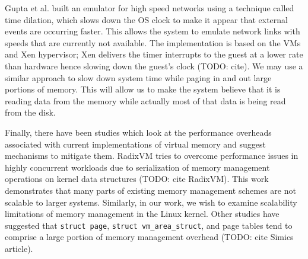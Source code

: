 \documentclass[twocolumn,11pt]{article}
\begin{document}
Gupta et al. built an emulator for high speed networks using a technique called
time dilation, which slows down the OS clock to make it appear that external
events are occurring faster. This allows the system to emulate network links
with speeds that are currently not available. The implementation is based on
the VMs and Xen hypervisor; Xen delivers the timer interrupts to the guest at a
lower rate than hardware hence  slowing down the guest’s clock (TODO: cite). We
may use a similar approach to slow down system time  while paging in and out
large portions of memory. This will allow us to make the system believe that it
is reading data from the memory while actually most of that data is being read
from the disk.

Finally, there have been studies which look at the performance overheads
associated with current implementations of virtual memory and suggest
mechanisms to mitigate them. RadixVM tries to overcome performance issues in
highly concurrent workloads due to serialization of memory management
operations on kernel data structures (TODO: cite RadixVM). This work
demonstrates that many parts of existing memory management schemes are not
scalable to larger systems. Similarly, in our work, we wish to examine
scalability limitations of memory management in the Linux kernel. Other studies
have suggested that \texttt{struct page}, \texttt{struct vm\_area\_struct}, and page tables
tend to comprise a large portion of memory management overhead (TODO: cite
Simics article).

{}

\end{document}
